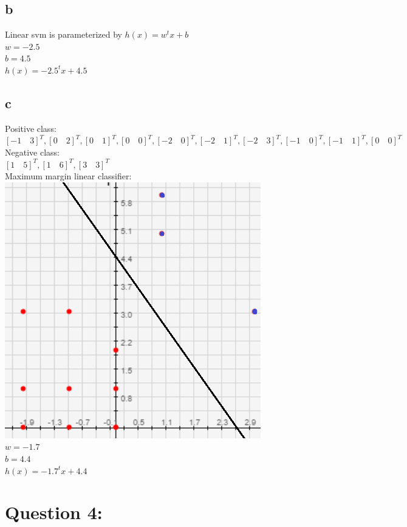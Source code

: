 \documentclass[11pt, oneside]{article}   	%
\begin{document}
\begin{flushleft}
\subsection*{b}
Linear svm is parameterized by $h(x)=w^t x+b$\\
$w=-2.5$\\
$b=4.5$\\
 $h(x)=-2.5^t x+4.5$\\
\subsection*{c}
Positive class: \\
$[-1\quad3]^T ,[0\quad2]^T ,[0\quad1]^T ,[0\quad0]^T ,[-2\quad0]^T ,[-2\quad1]^T ,[-2\quad3]^T ,[-1\quad0]^T ,[-1\quad1]^T ,[0\quad0]^T$\\
Negative class: \\
$[1\quad5]^T ,[1\quad6]^T ,[3\quad3]^T $\\
Maximum margin linear classifier:\\
\includegraphics[]{q3_2.png} \\
$w=-1.7$\\
$b=4.4$\\
 $h(x)=-1.7^t x+4.4$\\
\section*{Question 4:}

\end{flushleft}
\end{document}
